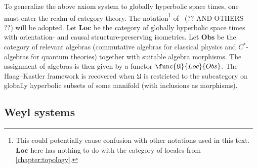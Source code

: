     To generalize the above axiom system to globally hyperbolic space times, one must enter the realm of category theory. The notation\footnote{This could potentially cause confusion with other notations used in this text. $\mathbf{Loc}$ here has nothing to do with the category of locales from \cref{chapter:topology}.} of~\citet{calaque_mathematical_2015} (?? AND OTHERS ??) will be adopted. Let $\mathbf{Loc}$ be the category of globally hyperbolic space times with orientation- and causal structure-preserving isometries. Let $\mathbf{Obs}$ be the category of relevant algebras (commutative algebras for classical physics and $C^*$-algebras for quantum theories) together with suitable algebra morphisms. The assignment of algebras is then given by a functor $\func{\mathfrak{U}}{Loc}{Obs}$. The Haag--Kastler framework is recovered when $\mathfrak{U}$ is restricted to the subcategory on globally hyperbolic subsets of some manifold (with inclusions as morphisms).

\subsection{Weyl systems}



